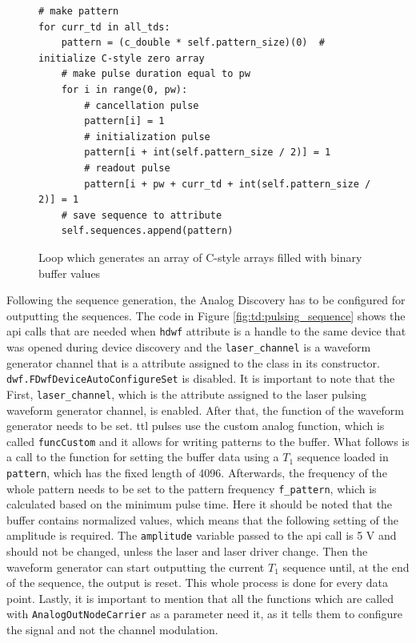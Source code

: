 \begin{figure}[ht]
	\begin{lstlisting}[language=pythe]		
# make pattern
for curr_td in all_tds:
	pattern = (c_double * self.pattern_size)(0)  # initialize C-style zero array
	# make pulse duration equal to pw
	for i in range(0, pw):
		# cancellation pulse
		pattern[i] = 1  
		# initialization pulse
		pattern[i + int(self.pattern_size / 2)] = 1  
		# readout pulse
		pattern[i + pw + curr_td + int(self.pattern_size / 2)] = 1 
	# save sequence to attribute 
	self.sequences.append(pattern)
	\end{lstlisting}
	\caption{Loop which generates an array of C-style arrays filled with binary buffer values}
	\label{fig:td:sequence_gen_loop}
\end{figure}

Following the sequence generation, the Analog Discovery has to be configured for outputting the sequences. The code in Figure \ref{fig:td:pulsing_sequence} shows the \gls{api} calls that are needed when \lstinline|hdwf| attribute is a handle to the same device that was opened during device discovery and the \lstinline|laser_channel| is a waveform generator channel that is a attribute assigned to the class in its constructor. \lstinline|dwf.FDwfDeviceAutoConfigureSet| is disabled. It is important to note that the  First, \lstinline|laser_channel|, which is the attribute assigned to the laser pulsing waveform generator channel, is enabled. After that, the function of the waveform generator needs to be set. \gls{ttl} pulses use the custom analog function, which is called \lstinline|funcCustom| and it allows for writing patterns to the buffer. What follows is a call to the function for setting the buffer data using a $T_1$ sequence loaded in \lstinline|pattern|, which has the fixed length of 4096. Afterwards, the frequency of the whole pattern needs to be set to the pattern frequency \lstinline|f_pattern|, which is calculated based on the minimum pulse time. Here it should be noted that the buffer contains normalized values, which means that the following setting of the amplitude is required. The \lstinline|amplitude| variable passed to the \gls{api} call is 5 \unit{\volt} and should not be changed, unless the laser and laser driver change. Then the waveform generator can start outputting the current $T_1$ sequence until, at the end of the sequence, the output is reset. This whole process is done for every data point. Lastly, it is important to mention that all the functions which are called with \lstinline|AnalogOutNodeCarrier| as a parameter need it, as it tells them to configure the signal and not the channel modulation.


